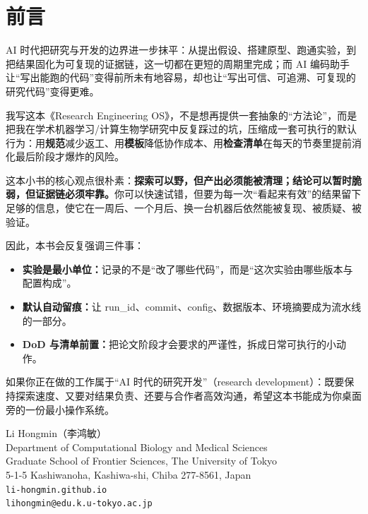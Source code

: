 \chapter*{前言}

AI 时代把研究与开发的边界进一步抹平：从提出假设、搭建原型、跑通实验，到把结果固化为可复现的证据链，这一切都在更短的周期里完成；而 AI 编码助手让“写出能跑的代码”变得前所未有地容易，却也让“写出可信、可追溯、可复现的研究代码”变得更难。

我写这本《Research Engineering OS》，不是想再提供一套抽象的“方法论”，而是把我在学术机器学习/计算生物学研究中反复踩过的坑，压缩成一套可执行的默认行为：用\textbf{规范}减少返工、用\textbf{模板}降低协作成本、用\textbf{检查清单}在每天的节奏里提前消化最后阶段才爆炸的风险。

这本小书的核心观点很朴素：\textbf{探索可以野，但产出必须能被清理；结论可以暂时脆弱，但证据链必须牢靠。}你可以快速试错，但要为每一次“看起来有效”的结果留下足够的信息，使它在一周后、一个月后、换一台机器后依然能被复现、被质疑、被验证。

因此，本书会反复强调三件事：
\begin{itemize}
  \item \textbf{实验是最小单位：}记录的不是“改了哪些代码”，而是“这次实验由哪些版本与配置构成”。
  \item \textbf{默认自动留痕：}让 run\_id、commit、config、数据版本、环境摘要成为流水线的一部分。
  \item \textbf{DoD 与清单前置：}把论文阶段才会要求的严谨性，拆成日常可执行的小动作。
\end{itemize}

如果你正在做的工作属于“AI 时代的研究开发”（research development）：既要保持探索速度、又要对结果负责、还要与合作者高效沟通，希望这本书能成为你桌面旁的一份最小操作系统。

\vspace{1.5\baselineskip}
\begin{flushright}
Li Hongmin（李鸿敏）\\
Department of Computational Biology and Medical Sciences\\
Graduate School of Frontier Sciences, The University of Tokyo\\
5-1-5 Kashiwanoha, Kashiwa-shi, Chiba 277-8561, Japan\\
\texttt{li-hongmin.github.io}\\
\texttt{lihongmin@edu.k.u-tokyo.ac.jp}
\end{flushright}